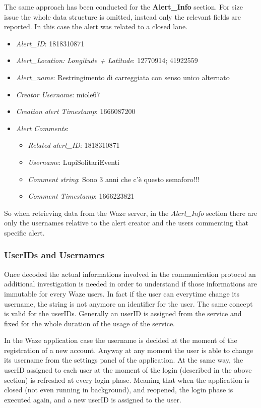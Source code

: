 			\par The same approach has been conducted for the \textbf{Alert\_Info} section. For size issue the whole data structure is omitted, instead only the relevant fields are reported. In this case the alert was related to a closed lane.
			 \begin{itemize}
			 	\item \textit{Alert\_ID}: 1818310871
			 	\item \textit{Alert\_Location: Longitude + Latitude}: 12770914; 41922559
			 	\item \textit{Alert\_name}: Restringimento di carreggiata con senso unico alternato
			 	\item \textit{Creator Username}: miole67
			 	\item \textit{Creation alert Timestamp}: 1666087200
			 	\item \textit{Alert Comments}:
			 		\begin{itemize}
			 			\item \textit{Related alert\_ID}: 1818310871
			 			\item \textit{Username}: LupiSolitariEventi
			 			\item \textit{Comment string}: Sono 3 anni che c’è questo semaforo!!!
			 			\item \textit{Comment Timestamp}: 1666223821
			 		\end{itemize}
			 \end{itemize}
			So when retrieving data from the Waze server, in the \textit{Alert\_Info} section there are only the usernames relative to the alert creator and the users commenting that specific alert.
			
			\subsubsection{UserIDs and Usernames}
				\par Once decoded the actual informations involved in the communication protocol an additional investigation is needed in order to understand if those informations are immutable for every Waze users. In fact if the user can everytime change its username, the string is not anymore an identifier for the user. The same concept is valid for the userIDs. Generally an userID is assigned from the service and fixed for the whole duration of the usage of the service. \newline
				\par In the Waze application case the username is decided at the moment of the registration of a new account. Anyway at any moment the user is able to change its username from the settings panel of the application.\newline
				At the same way, the userID assigned to each user at the moment of the login (described in the above section) is refreshed at every login phase. Meaning that when the application is closed (not even running in background), and reopened, the login phase is executed again, and a new userID is assigned to the user.
			
